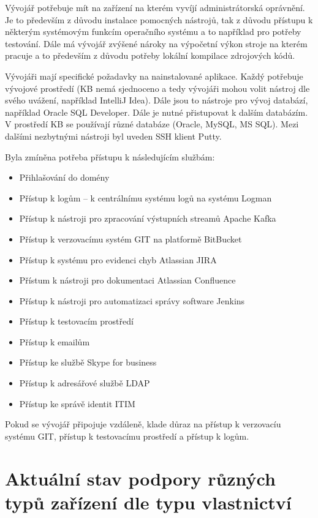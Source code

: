 Vývojář potřebuje mít na zařízení na kterém vyvíjí administrátorská oprávnění. Je to především z důvodu instalace pomocných nástrojů, tak z důvodu přístupu k některým systémovým funkcím operačního systému a to například pro potřeby testování. Dále má vývojář zvýšené nároky na výpočetní výkon stroje na kterém pracuje a to především z důvodu potřeby lokální kompilace zdrojových kódů. 

Vývojáři mají specifické požadavky na nainstalované aplikace. Každý potřebuje vývojové prostředí (KB nemá sjednoceno a tedy vývojáři mohou volit nástroj dle svého uvážení, například IntelliJ Idea). Dále jsou to nástroje pro vývoj databází, například Oracle SQL Developer. Dále je nutné přistupovat k dalším databázím. V prostředí KB se používají různé databáze (Oracle, MySQL, MS SQL). Mezi dalšími nezbytnými nástroji byl uveden SSH klient Putty.

Byla zmíněna potřeba přístupu k následujícím službám:
\begin{itemize}
    \item Přihlašování do domény
    \item Přístup k logům -- k centrálnímu systému logů na systému Logman
    \item Přístup k nástroji pro zpracování výstupních streamů Apache Kafka
    \item Přístup k verzovacímu systém GIT na platformě BitBucket
    \item Přístup k systému pro evidenci chyb Atlassian JIRA
    \item Přístum k nástroji pro dokumentaci Atlassian Confluence
    \item Přístup k nástroji pro automatizaci správy software Jenkins
    \item Přístup k testovacím prostředí
    \item Přístup k emailům 
    \item Přístup ke službě Skype for business
    \item Přístup k adresářové službě LDAP
    \item Přístup ke správě identit ITIM
\end{itemize}

Pokud se vývojář připojuje vzdáleně, klade důraz na přístup k verzovacíu systému GIT, přístup k testovacímu prostředí a přístup k logům.

\section{Aktuální stav podpory různých typů zařízení dle typu vlastnictví}


